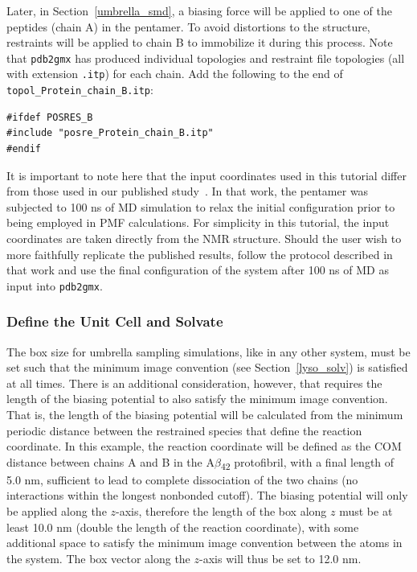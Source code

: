 \documentclass[9pt,tutorial]{livecoms}
\begin{document}
Later, in Section~\ref{umbrella_smd}, a biasing force will be applied to one of the peptides (chain A) in the pentamer. To avoid distortions to the structure, restraints will be applied to chain B to immobilize it during this process. Note that \texttt{pdb2gmx} has produced individual topologies and restraint file topologies (all with extension \texttt{.itp}) for each chain. Add the following to the end of \texttt{topol\_Protein\_chain\_B.itp}:

\begin{verbatim}
#ifdef POSRES_B
#include "posre_Protein_chain_B.itp"
#endif
\end{verbatim}

It is important to note here that the input coordinates used in this tutorial differ from those used in our published study~\cite{Lemkul2010}. In that work, the pentamer was subjected to 100 ns of MD simulation to relax the initial configuration prior to being employed in PMF calculations. For simplicity in this tutorial, the input coordinates are taken directly from the NMR structure. Should the user wish to more faithfully replicate the published results, follow the protocol described in that work and use the final configuration of the system after 100 ns of MD as input into \texttt{pdb2gmx}.

\subsubsection{Define the Unit Cell and Solvate} \label{umbrella_box}

The box size for umbrella sampling simulations, like in any other system, must be set such that the minimum image convention (see Section~\ref{lyso_solv}) is satisfied at all times. There is an additional consideration, however, that requires the length of the biasing potential to also satisfy the minimum image convention. That is, the length of the biasing potential will be calculated from the minimum periodic distance between the restrained species that define the reaction coordinate. In this example, the reaction coordinate will be defined as the COM distance between chains A and B in the A$\beta$\textsubscript{42} protofibril, with a final length of 5.0 nm, sufficient to lead to complete dissociation of the two chains (no interactions within the longest nonbonded cutoff). The biasing potential will only be applied along the $z$-axis, therefore the length of the box along $z$ must be at least 10.0 nm (double the length of the reaction coordinate), with some additional space to satisfy the minimum image convention between the atoms in the system. The box vector along the $z$-axis will thus be set to 12.0 nm.
\end{document}
